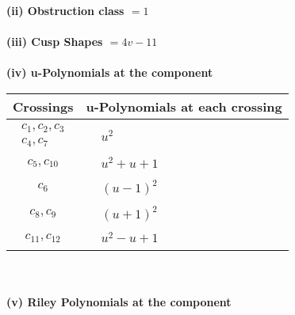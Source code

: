 \documentclass[1p]{elsarticle_modified}
\theoremstyle{definition}
\begin{document}
\flushleft \textbf{(ii) Obstruction class $= 1$}\\~\\
\flushleft \textbf{(iii) Cusp Shapes $= 4 v-11$}\\~\\
\newpage\renewcommand{\arraystretch}{1}
\flushleft \textbf{(iv) u-Polynomials at the component}\newline \\
\begin{tabular}{m{50pt}|m{274pt}}
Crossings & \hspace{64pt}u-Polynomials at each crossing \\
\hline $$\begin{aligned}c_{1},c_{2},c_{3}\\c_{4},c_{7}\end{aligned}$$&$\begin{aligned}
&u^2
\end{aligned}$\\
\hline $$\begin{aligned}c_{5},c_{10}\end{aligned}$$&$\begin{aligned}
&u^2+u+1
\end{aligned}$\\
\hline $$\begin{aligned}c_{6}\end{aligned}$$&$\begin{aligned}
&(u-1)^2
\end{aligned}$\\
\hline $$\begin{aligned}c_{8},c_{9}\end{aligned}$$&$\begin{aligned}
&(u+1)^2
\end{aligned}$\\
\hline $$\begin{aligned}c_{11},c_{12}\end{aligned}$$&$\begin{aligned}
&u^2- u+1
\end{aligned}$\\
\hline
\end{tabular}\\~\\
\newpage\renewcommand{\arraystretch}{1}
\flushleft \textbf{(v) Riley Polynomials at the component}\newline \\
\end{document}
